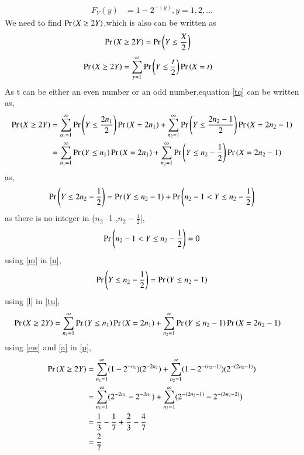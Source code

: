 \documentclass[journal,12pt,twocolumn]{IEEEtran}
\begin{document}
\begin{align}
    F_Y(y)&=1-2^{-(y)} ,y=1,2,\dots  \label{ew}
\end{align} 
We need to find $\Pr\left(X\ge 2Y\right)$,which is also can be written as
\begin{align}
\Pr\left(X\ge 2Y\right) &=\Pr\left(Y\le \frac{X}{2}\right)
\end{align}
\begin{align}
    \Pr\left(X\ge 2Y\right) &=\sum_{y=1}^{\infty}\Pr\left(Y \le \frac{t}{2}\right)\Pr\left(X=t\right)   \label{tq}
\end{align}
As t can be either an even number or an odd number,equation \eqref{tq} can be written as,
\begin{align}
 \Pr\left(X\ge 2Y\right) &=\sum_{n_1=1}^{\infty}\Pr\left(Y\le \frac{2n_1}{2}\right)\Pr\left(X=2n_1\right) +
 \sum_{n_2=1}^{\infty}\Pr\left(Y\le \frac{2n_2 - 1}{2}\right)\Pr\left(X=2n_2 -1\right)\\ 
 &=\sum_{n_1=1}^{\infty}\Pr\left(Y\le n_1\right)\Pr\left(X=2n_1\right) +
 \sum_{n_2=1}^{\infty}\Pr\left(Y\le n_2 -\frac{1}{2}\right)\Pr\left(X=2n_2 -1\right) \label{tu}   
\end{align}
as,
\begin{align}
\Pr\left(Y\le 2n_2 -\frac{1}{2}\right) = \Pr\left(Y\le n_2 -1\right) + \Pr\left(n_2 -1 < Y\le n_2 -\frac{1}{2}\right) \label{n}
\end{align} 
as there is no integer in ($n_2$ -1 ,$n_2 - \frac{1}{2} ]$,
\begin{align}
\Pr\left(n_2 -1 < Y\le n_2 -\frac{1}{2}\right) = 0 \label{m}
\end{align} 
using \eqref{m} in \eqref{n},
\begin{align}
\Pr\left(Y\le n_2 -\frac{1}{2}\right) = \Pr\left(Y\le n_2 -1\right) \label{l}
\end{align} 
using \eqref{l} in \eqref{tu},
\begin{align}
 \Pr\left(X\ge 2Y\right) &=\sum_{n_1=1}^{\infty}\Pr\left(Y\le n_1\right)\Pr\left(X=2n_1\right) + \sum_{n_2=1}^{\infty}\Pr\left(Y\le n_2 -1\right)\Pr\left(X=2n_2 -1\right) \label{p} 
\end{align}
using \eqref{ew} and \eqref{a} in \eqref{p},
\begin{align}
\Pr\left(X\ge 2Y\right) &=\sum_{n_1=1}^{\infty}(1-2^{-n_1})(2^{-2n_1}) + \sum_{n_2=1}^{\infty}(1-2^{-(n_2 -1)})(2^{-(2n_2 - 1)})\\
 &=\sum_{n_1=1}^{\infty}(2^{-2n_1} - 2^{-3n_1}) + \sum_{n_2=1}^{\infty}(2^{-(2n_2 -1)} - 2^{-(3n_2 -2)})\\
 &= \frac{1}{3} - \frac{1}{7} +\frac{2}{3} -\frac{4}{7}\\
 &= \frac{2}{7}
\end{align}
\end{document}
